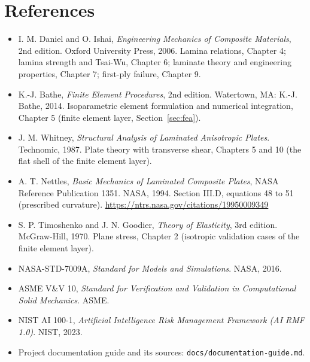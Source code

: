 \documentclass[11pt,letterpaper]{article}
\begin{document}
\section{References}
\begin{itemize}[leftmargin=1.2em, itemsep=0.6ex]
  \item I. M. Daniel and O. Ishai, \emph{Engineering Mechanics of Composite Materials}, 2nd edition. Oxford University
    Press, 2006. Lamina relations, Chapter 4; lamina strength and Tsai-Wu, Chapter 6; laminate theory and engineering
    properties, Chapter 7; first-ply failure, Chapter 9.
  \item K.-J. Bathe, \emph{Finite Element Procedures}, 2nd edition. Watertown, MA: K.-J. Bathe, 2014. Isoparametric
    element formulation and numerical integration, Chapter 5 (finite element layer, Section~\ref{sec:fea}).
  \item J. M. Whitney, \emph{Structural Analysis of Laminated Anisotropic Plates}. Technomic, 1987. Plate theory with
    transverse shear, Chapters 5 and 10 (the flat shell of the finite element layer).
  \item A. T. Nettles, \emph{Basic Mechanics of Laminated Composite Plates}, NASA Reference Publication 1351. NASA, 1994.
    Section III.D, equations 48 to 51 (prescribed curvature). \url{https://ntrs.nasa.gov/citations/19950009349}

  \item S. P. Timoshenko and J. N. Goodier, \emph{Theory of Elasticity}, 3rd edition. McGraw-Hill, 1970. Plane stress,
    Chapter 2 (isotropic validation cases of the finite element layer).
  \item NASA-STD-7009A, \emph{Standard for Models and Simulations}. NASA, 2016.
  \item ASME V\&V 10, \emph{Standard for Verification and Validation in Computational Solid Mechanics}. ASME.
  \item NIST AI 100-1, \emph{Artificial Intelligence Risk Management Framework (AI RMF 1.0)}. NIST, 2023.
  \item Project documentation guide and its sources: \texttt{docs/documentation-guide.md}.
\end{itemize}
\end{document}
